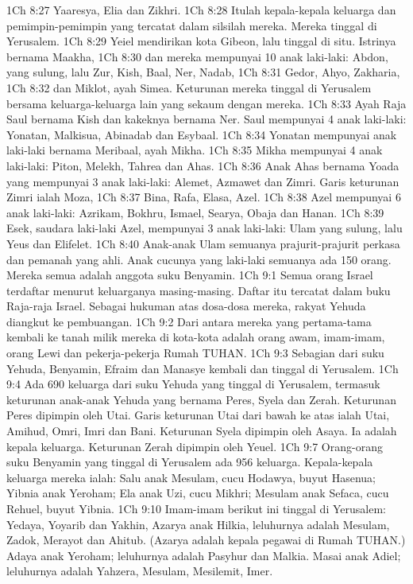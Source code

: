 1Ch 8:27  Yaaresya, Elia dan Zikhri.
1Ch 8:28  Itulah kepala-kepala keluarga dan pemimpin-pemimpin yang tercatat dalam silsilah mereka. Mereka tinggal di Yerusalem.
1Ch 8:29  Yeiel mendirikan kota Gibeon, lalu tinggal di situ. Istrinya bernama Maakha,
1Ch 8:30  dan mereka mempunyai 10 anak laki-laki: Abdon, yang sulung, lalu Zur, Kish, Baal, Ner, Nadab,
1Ch 8:31  Gedor, Ahyo, Zakharia,
1Ch 8:32  dan Miklot, ayah Simea. Keturunan mereka tinggal di Yerusalem bersama keluarga-keluarga lain yang sekaum dengan mereka.
1Ch 8:33  Ayah Raja Saul bernama Kish dan kakeknya bernama Ner. Saul mempunyai 4 anak laki-laki: Yonatan, Malkisua, Abinadab dan Esybaal.
1Ch 8:34  Yonatan mempunyai anak laki-laki bernama Meribaal, ayah Mikha.
1Ch 8:35  Mikha mempunyai 4 anak laki-laki: Piton, Melekh, Tahrea dan Ahas.
1Ch 8:36  Anak Ahas bernama Yoada yang mempunyai 3 anak laki-laki: Alemet, Azmawet dan Zimri. Garis keturunan Zimri ialah Moza,
1Ch 8:37  Bina, Rafa, Elasa, Azel.
1Ch 8:38  Azel mempunyai 6 anak laki-laki: Azrikam, Bokhru, Ismael, Searya, Obaja dan Hanan.
1Ch 8:39  Esek, saudara laki-laki Azel, mempunyai 3 anak laki-laki: Ulam yang sulung, lalu Yeus dan Elifelet.
1Ch 8:40  Anak-anak Ulam semuanya prajurit-prajurit perkasa dan pemanah yang ahli. Anak cucunya yang laki-laki semuanya ada 150 orang. Mereka semua adalah anggota suku Benyamin.
1Ch 9:1  Semua orang Israel terdaftar menurut keluarganya masing-masing. Daftar itu tercatat dalam buku Raja-raja Israel. Sebagai hukuman atas dosa-dosa mereka, rakyat Yehuda diangkut ke pembuangan.
1Ch 9:2  Dari antara mereka yang pertama-tama kembali ke tanah milik mereka di kota-kota adalah orang awam, imam-imam, orang Lewi dan pekerja-pekerja Rumah TUHAN.
1Ch 9:3  Sebagian dari suku Yehuda, Benyamin, Efraim dan Manasye kembali dan tinggal di Yerusalem.
1Ch 9:4  Ada 690 keluarga dari suku Yehuda yang tinggal di Yerusalem, termasuk keturunan anak-anak Yehuda yang bernama Peres, Syela dan Zerah. Keturunan Peres dipimpin oleh Utai. Garis keturunan Utai dari bawah ke atas ialah Utai, Amihud, Omri, Imri dan Bani. Keturunan Syela dipimpin oleh Asaya. Ia adalah kepala keluarga. Keturunan Zerah dipimpin oleh Yeuel.
1Ch 9:7  Orang-orang suku Benyamin yang tinggal di Yerusalem ada 956 keluarga. Kepala-kepala keluarga mereka ialah: Salu anak Mesulam, cucu Hodawya, buyut Hasenua; Yibnia anak Yeroham; Ela anak Uzi, cucu Mikhri; Mesulam anak Sefaca, cucu Rehuel, buyut Yibnia.
1Ch 9:10  Imam-imam berikut ini tinggal di Yerusalem: Yedaya, Yoyarib dan Yakhin, Azarya anak Hilkia, leluhurnya adalah Mesulam, Zadok, Merayot dan Ahitub. (Azarya adalah kepala pegawai di Rumah TUHAN.) Adaya anak Yeroham; leluhurnya adalah Pasyhur dan Malkia. Masai anak Adiel; leluhurnya adalah Yahzera, Mesulam, Mesilemit, Imer.
